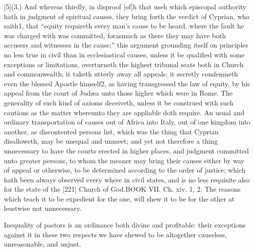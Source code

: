 [5](3.) And whereas thirdly, in disproof [of]h that useh which episcopal authority hath in judgment of spiritual causes, they bring forth the verdict of Cyprian, who saith1, that “equity requireth every man’s cause to be heard, where the fault he was charged with was committed, forasmuch as there they may have both accusers and witnesses in the cause;” this argument grounding itself on principles no less true in civil than in ecclesiastical causes, unless it be qualified with some exceptions or limitations, overturneth the highest tribunal seats both in Church and commonwealth; it taketh utterly away all appeals; it secretly condemneth even the blessed Apostle himself2, as having transgressed the law of equity, by his appeal from the court of Judæa unto those higher which were in Rome. The generality of such kind of axioms deceiveth, unless it be construed with such cautions as the matter whereunto they are appliable doth require. An usual and ordinary transportation of causes out of Africa into Italy, out of one kingdom into another, as discontented persons list, which was the thing that Cyprian disalloweth, may be unequal and unmeet; and yet not therefore a thing unnecessary to have the courts erected in higher places, and judgment committed unto greater persons, to whom the meaner may bring their causes either by way of appeal or otherwise, to be determined according to the order of justice; which hath been always observed every where in civil states, and is no less requisite also for the state of the [221] Church of God.BOOK VII. Ch. xiv. 1, 2. The reasons which teach it to be expedient for the one, will shew it to be for the other at leastwise not unnecessary.

Inequality of pastors is an ordinance both divine and profitable: their exceptions against it in these two respects we have shewed to be altogether causeless, unreasonable, and unjust.

